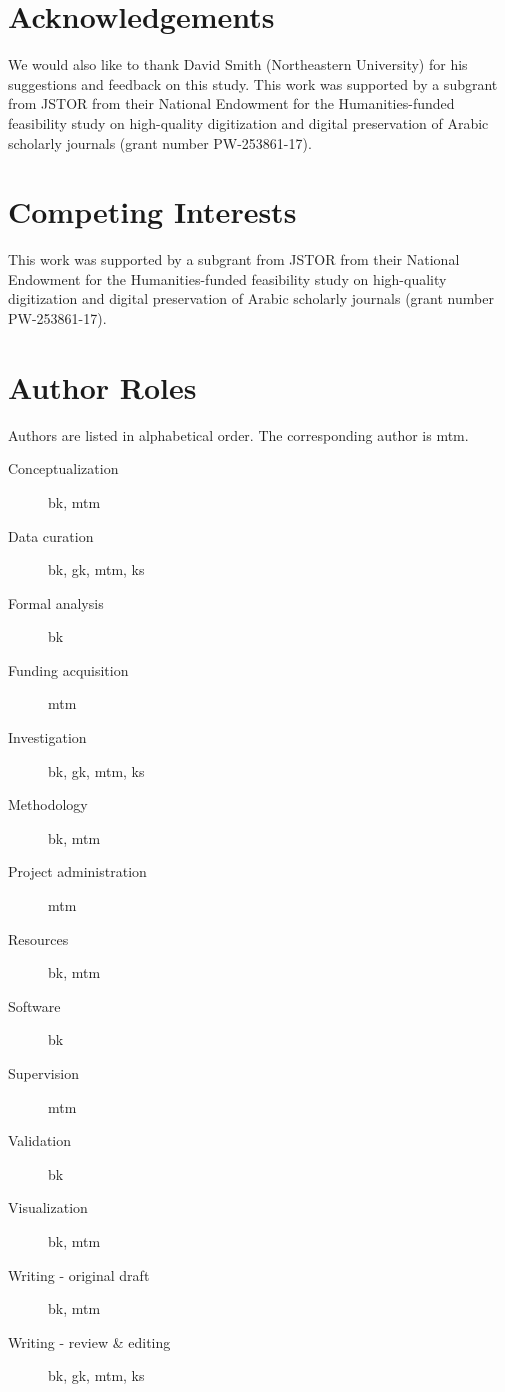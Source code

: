 \section*{Acknowledgements}

We would also like to thank David Smith (Northeastern University) for his
suggestions and feedback on this study. This work was supported by a subgrant
from JSTOR from their National Endowment for the Humanities-funded feasibility
study on high-quality digitization and digital preservation of Arabic scholarly
journals (grant number PW-253861-17).


\section*{Competing Interests}

This work was supported by a subgrant from JSTOR from their National Endowment
for the Humanities-funded feasibility study on high-quality digitization and
digital preservation of Arabic scholarly journals (grant number PW-253861-17).

\section*{Author Roles}

Authors are listed in alphabetical order. The corresponding author is mtm.
\begin{description}
\item[Conceptualization] bk, mtm
\item[Data curation] bk, gk, mtm, ks
\item[Formal analysis] bk
\item[Funding acquisition] mtm
\item[Investigation] bk, gk, mtm, ks
\item[Methodology] bk, mtm
\item[Project administration] mtm
\item[Resources] bk, mtm
\item[Software] bk
\item[Supervision] mtm
\item[Validation] bk
\item[Visualization] bk, mtm
\item[Writing - original draft] bk, mtm
\item[Writing - review \& editing] bk, gk, mtm, ks
\end{description}
